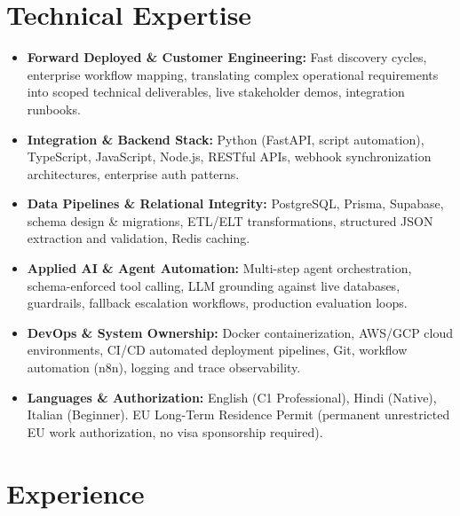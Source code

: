 \documentclass[10pt,a4paper]{article}
\begin{document}
\section{Technical Expertise}
\begin{itemize}
  \item \textbf{Forward Deployed \& Customer Engineering:} Fast discovery cycles, enterprise workflow mapping, translating complex operational requirements into scoped technical deliverables, live stakeholder demos, integration runbooks.
  \item \textbf{Integration \& Backend Stack:} Python (FastAPI, script automation), TypeScript, JavaScript, Node.js, RESTful APIs, webhook synchronization architectures, enterprise auth patterns.
  \item \textbf{Data Pipelines \& Relational Integrity:} PostgreSQL, Prisma, Supabase, schema design \& migrations, ETL/ELT transformations, structured JSON extraction and validation, Redis caching.
  \item \textbf{Applied AI \& Agent Automation:} Multi-step agent orchestration, schema-enforced tool calling, LLM grounding against live databases, guardrails, fallback escalation workflows, production evaluation loops.
  \item \textbf{DevOps \& System Ownership:} Docker containerization, AWS/GCP cloud environments, CI/CD automated deployment pipelines, Git, workflow automation (n8n), logging and trace observability.
  \item \textbf{Languages \& Authorization:} English (C1 Professional), Hindi (Native), Italian (Beginner). EU Long-Term Residence Permit (permanent unrestricted EU work authorization, no visa sponsorship required).
\end{itemize}

\section{Experience}
\end{document}
